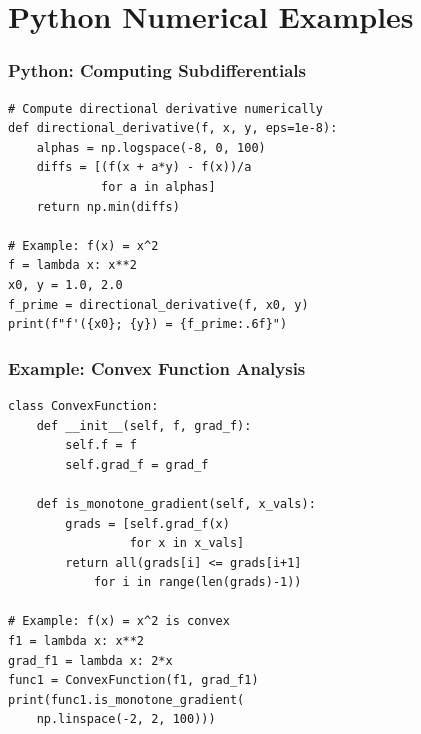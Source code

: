 \documentclass[aspectratio=169,10pt]{beamer}
\begin{document}
\section{Python Numerical Examples}
\begin{frame}[fragile]
  \frametitle{Python: Computing Subdifferentials}

  \begin{lstlisting}
# Compute directional derivative numerically
def directional_derivative(f, x, y, eps=1e-8):
    alphas = np.logspace(-8, 0, 100)
    diffs = [(f(x + a*y) - f(x))/a
             for a in alphas]
    return np.min(diffs)

# Example: f(x) = x^2
f = lambda x: x**2
x0, y = 1.0, 2.0
f_prime = directional_derivative(f, x0, y)
print(f"f'({x0}; {y}) = {f_prime:.6f}")
  \end{lstlisting}
\end{frame}

\begin{frame}[fragile]
  \frametitle{Example: Convex Function Analysis}

  \begin{lstlisting}
class ConvexFunction:
    def __init__(self, f, grad_f):
        self.f = f
        self.grad_f = grad_f

    def is_monotone_gradient(self, x_vals):
        grads = [self.grad_f(x)
                 for x in x_vals]
        return all(grads[i] <= grads[i+1]
            for i in range(len(grads)-1))

# Example: f(x) = x^2 is convex
f1 = lambda x: x**2
grad_f1 = lambda x: 2*x
func1 = ConvexFunction(f1, grad_f1)
print(func1.is_monotone_gradient(
    np.linspace(-2, 2, 100)))
  \end{lstlisting}
\end{frame}
\end{document}
